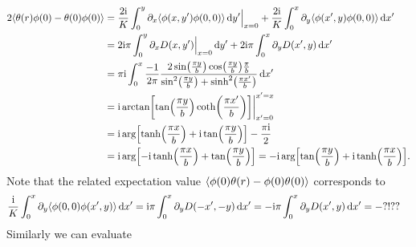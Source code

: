 \documentclass[english, parskip=full]{scrartcl}
\begin{document}
\begin{align}
2\bra*{\theta(r)\phi(0) - \theta(0)\phi(0)} &= \frac{2\i}{K} \intx{0}{y}{\partial_x \bra*{\phi(x,y')\phi(0,0)}}{y'}\Big\vert_{x=0} + \frac{2\i}{K} \intx{0}{x}{\partial_y\bra*{\phi(x',y)\phi(0,0)}}{x'}\\
&= 2\i\pi \intx{0}{y}{\partial_x D(x,y') \Big\vert_{x=0}}{y'} + 2\i\pi \intx{0}{x}{\partial_y D(x',y)}{x'}\\
&= \pi\i \intx{0}{x}{\frac{-1}{2\pi} \frac{2\sin\kla*{\frac{\pi y}{b}} \cos\kla*{\frac{\pi y}{b}} \frac{\pi}{b}}{\sin^2\kla*{\frac{\pi y}{b}} + \sinh^2\kla*{\frac{\pi x'}{b}}}}{x'}\\
&= \i \arctan\klb*{\tan\kla*{\frac{\pi y}{b}} \coth\kla*{\frac{\pi x'}{b}}}\bigg\vert_{x'=0}^{x'=x}\\
&= \i \arg\klb*{\tanh\kla*{\frac{\pi x}{b}} + \i \tan\kla*{\frac{\pi y}{b}}} - \frac{\pi \i}{2}\\
&= \i \arg\klb*{-\i \tanh\kla*{\frac{\pi x}{b}} + \tan\kla*{\frac{\pi y}{b}}} = -\i \arg\klb*{\tan\kla*{\frac{\pi y}{b}} + \i \tanh\kla*{\frac{\pi x}{b}}}.
\end{align}
Note that the related expectation value $\bra*{\phi(0)\theta(r) - \phi(0)\theta(0)}$ corresponds to
\begin{align}
\frac{\i}{K} \intx{0}{x}{\partial_y \bra*{\phi(0,0)\phi(x',y)}}{x'} &= \i\pi \intx{0}{x}{\partial_y D(-x',-y)}{x'} = -\i\pi \intx{0}{x}{\partial_y D(x',y)}{x'} = -?!??
\end{align}
Similarly we can evaluate
\end{document}
